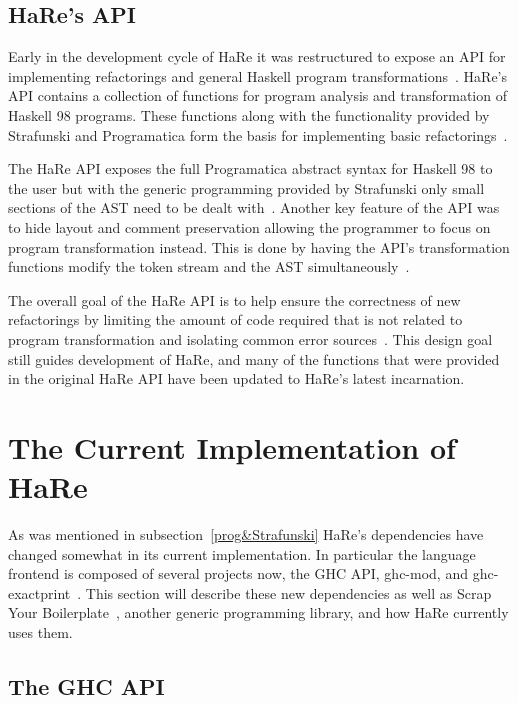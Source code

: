 \subsection{HaRe's API}\label{hareApi}

Early in the development cycle of HaRe it was restructured to expose an API for implementing refactorings and general Haskell program transformations~\citep{hareApi}. HaRe's API contains a collection of functions for program analysis and transformation of Haskell 98 programs. These functions along with the functionality provided by Strafunski and Programatica form the basis for implementing basic refactorings~\citep{hareApi}.

The HaRe API exposes the full Programatica abstract syntax for Haskell 98 to the user but with the generic programming provided by Strafunski only small sections of the AST need to be dealt with~\citep{hareApi}. Another key feature of the API was to hide layout and comment preservation allowing the programmer to focus on program transformation instead. This is done by having the API's transformation functions modify the token stream and the AST simultaneously~\citep{hareApi}. 

The overall goal of the HaRe API is to help ensure the correctness of new refactorings by limiting the amount of code required that is not related to program transformation and isolating common error sources~\citep{hareApi}. This design goal still guides development of HaRe, and many of the functions that were provided in the original HaRe API have been updated to HaRe's latest incarnation. 
 
\section{The Current Implementation of HaRe}

As was mentioned in subsection~\ref{prog&Strafunski} HaRe's dependencies have changed somewhat in its current implementation. In particular the language frontend is composed of several projects now, the GHC API, ghc-mod, and ghc-exactprint~\citep{ghcApi,ghcMod,exactprint}. This section will describe these new dependencies as well as Scrap Your Boilerplate~\citep{syb}, another generic programming library, and how HaRe currently uses them.

\subsection{The GHC API}

